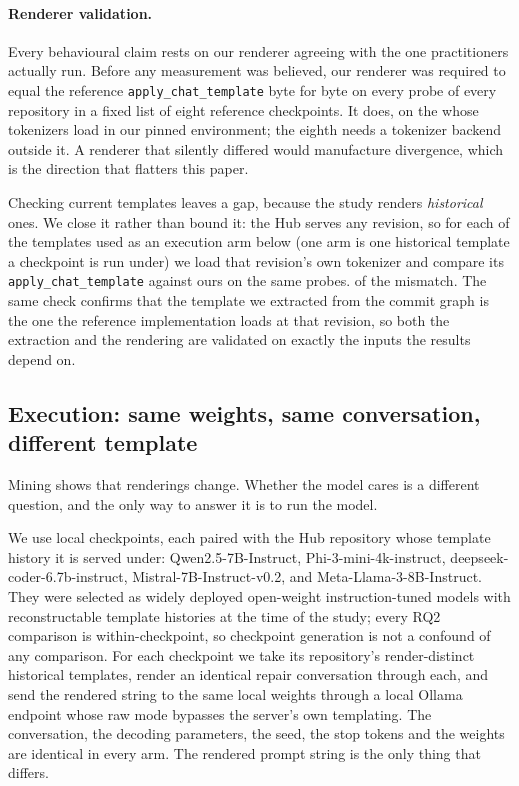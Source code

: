 \paragraph{Renderer validation.} Every behavioural claim rests on our renderer agreeing with the one
practitioners actually run. Before any measurement was believed, our renderer was required to equal
the reference \texttt{apply\_\allowbreak chat\_\allowbreak template} byte for byte on every probe of
every repository in a fixed list of eight reference checkpoints. It does, on the \NValidated{}
whose tokenizers load in our pinned environment; the eighth needs a tokenizer backend outside it. A renderer that silently differed would manufacture divergence, which is the direction that
flatters this paper.

Checking current templates leaves a gap, because the study renders \emph{historical} ones. We close
it rather than bound it: the Hub serves any revision, so for each of the \NHistChecked{} templates
used as an execution arm below (one arm is one historical template a checkpoint is run under) we
load that revision's own tokenizer and compare its
\texttt{apply\_\allowbreak chat\_\allowbreak template} against ours on the same probes.
\NHistMismatch{} of the \NHistChecked{} mismatch. The same check confirms that the template we extracted from the commit
graph is the one the reference implementation loads at that revision, so both the extraction and the
rendering are validated on exactly the inputs the results depend on.

\subsection{Execution: same weights, same conversation, different template}
\label{sec:exec}

Mining shows that renderings change. Whether the model cares is a different question, and the
only way to answer it is to run the model.

We use \NCheckpoints{} local checkpoints, each paired with the Hub repository whose template
history it is served under: Qwen2.5-7B-Instruct, Phi-3-mini-4k-instruct,
deepseek-coder-6.7b-instruct, Mistral-7B-Instruct-v0.2, and Meta-Llama-3-8B-Instruct. They were
selected as widely deployed open-weight instruction-tuned models with reconstructable template
histories at the time of the study; every RQ2 comparison is within-checkpoint, so checkpoint
generation is not a confound of any comparison. For each checkpoint we take its
repository's render-distinct historical templates, render an identical repair conversation through
each, and send the rendered string to the same local weights through a local Ollama endpoint whose
raw mode bypasses the
server's own templating. The conversation, the decoding parameters, the seed, the stop tokens and
the weights are identical in every arm. The rendered prompt string is the only thing that differs.

